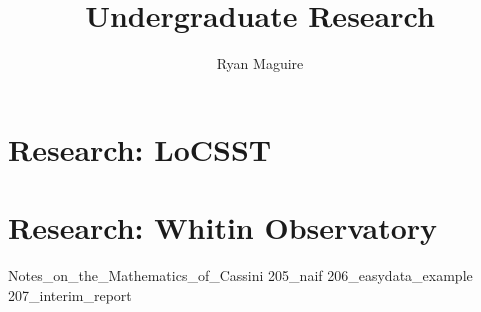 \documentclass[crop=false,class=book,oneside]{standalone}
\begin{document}
    \newif\ifresearch
    \ifstandalone
        \title{Undergraduate Research}
        \author{Ryan Maguire}
        \date{\vspace{-5ex}}
        \maketitle
        \tableofcontents
        \listoffigures
        \listoftables
        \clearpage
    \fi
    \part{Research: LoCSST}
    \part{Research: Whitin Observatory}
        
                  {Notes_on_the_Mathematics_of_Cassini}
    {205_naif}
    {206_easydata_example}
    {207_interim_report}
\end{document}

